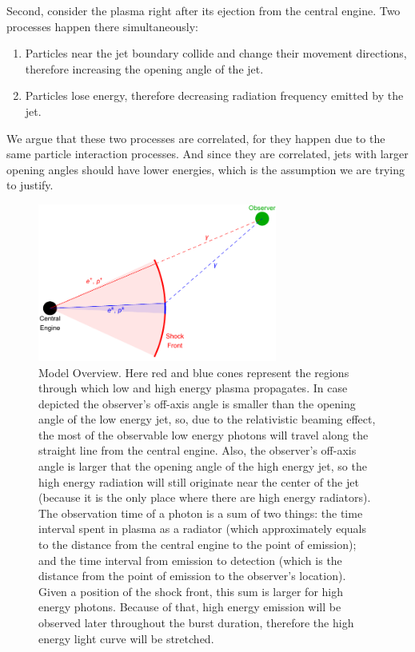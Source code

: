 \documentclass{article}
\begin{document}
	Second, consider the plasma right after its ejection from the central engine.
	Two processes happen there simultaneously:
	\begin{enumerate}
		\item{Particles near the jet boundary collide and change their movement directions, therefore increasing the opening angle of the jet.}
		\item{Particles lose energy, therefore decreasing radiation frequency emitted by the jet.}
	\end{enumerate}
	We argue that these two processes are correlated, for they happen due to the same particle interaction processes.
	And since they are correlated, jets with larger opening angles should have lower energies, which is the assumption we are trying to justify.

	\begin{figure}
        \centering
        \includegraphics[width=0.7\textwidth]{modelOverview}
        \caption{
        	Model Overview.
        	Here red and blue cones represent the regions through which low and high energy plasma propagates.
        	In case depicted the observer's off-axis angle is smaller than the opening angle of the low energy jet, so, due to the relativistic beaming effect, the most of the observable low energy photons will travel along the straight line from the central engine.
        	Also, the observer's off-axis angle is larger that the opening angle of the high energy jet, so the high energy radiation will still originate near the center of the jet (because it is the only place where there are high energy radiators).
        	The observation time of a photon is a sum of two things: the time interval spent in plasma as a radiator (which approximately equals to the distance from the central engine to the point of emission); and the time interval from emission to detection (which is the distance from the point of emission to the observer's location).
        	Given a position of the shock front, this sum is larger for high energy photons.
        	Because of that, high energy emission will be observed later throughout the burst duration, therefore the high energy light curve will be stretched.
        }
        \label{fig:modelOverview}
	\end{figure}
\end{document}
